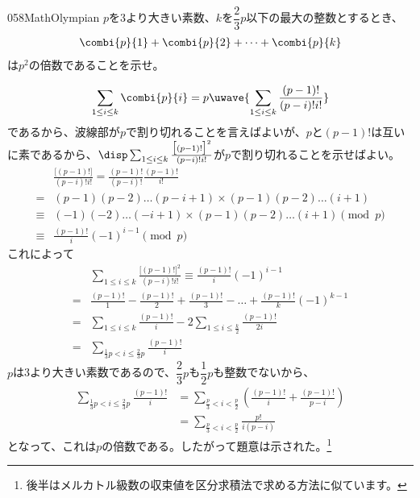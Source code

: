 \begin{thm}{058}{}{MathOlympian}
 $p$を3より大きい素数、$k$を$\dfrac{2}{3}p$以下の最大の整数とするとき、
 \begin{align*}
  \combi{p}{1}+\combi{p}{2}+\dots+\combi{p}{k}
 \end{align*}
 は$p^2$の倍数であることを示せ。
\end{thm}

\[ \sum_{1\le i\le k} \combi{p}{i}=p\uwave{\sum_{1\le i\le k}\frac{(p-1)!}{(p-i)! i!}} \]
であるから、波線部が$p$で割り切れることを言えばよいが、$p$と$(p-1)!$は互いに素であるから、$\disp \sum_{1\le i\le k}\frac{\bigl[(p-1)!\bigr]^2}{(p-i)! i!}$が$p$で割り切れることを示せばよい。
\begin{align*}
 &\frac{\bigl[(p-1)!\bigr]}{(p-i)! i!}=\frac{(p-1)!}{(p-i)!}\frac{(p-1)!}{i!} \\
 =& (p-1)(p-2)\dots(p-i+1)\times(p-1)(p-2)\dots(i+1) \\
 \equiv & (-1)(-2)\dots(-i+1)\times(p-1)(p-2)\dots(i+1) \pmod{p} \\
 \equiv & \frac{(p-1)!}{i}(-1)^{i-1} \pmod{p}
\end{align*}
これによって
\begin{align*}
 &\sum_{1\le i\le k} \frac{\bigl[(p-1)!\bigr]^2}{(p-i)! i!}\equiv \frac{(p-1)!}{i}(-1)^{i-1} \\
 =& \frac{(p-1)!}{1}-\frac{(p-1)!}{2}+\frac{(p-1)!}{3}-\dots+\frac{(p-1)!}{k}(-1)^{k-1} \\
 =& \sum_{1\le i\le k} \frac{(p-1)!}{i} - 2\sum_{1\le i\le \frac{k}{2}}\frac{(p-1)!}{2i} \\
 =& \sum_{\frac{1}{3}p< i\le \frac{2}{3}p} \frac{(p-1)!}{i}
\end{align*}
$p$は3より大きい素数であるので、$\dfrac{2}{3}p$も$\dfrac{1}{2}p$も整数でないから、
\begin{align*}
 \sum_{\frac{1}{3}p< i\le \frac{2}{3}p} \frac{(p-1)!}{i} &= \sum_{\frac{p}{3}<i<\frac{p}{2}}\left(\frac{(p-1)!}{i}+\frac{(p-1)!}{p-i}\right) \\
 &= \sum_{\frac{p}{3}<i<\frac{p}{2}} \frac{p!}{i(p-i)}
\end{align*}
となって、これは$p$の倍数である。したがって題意は示された。\footnote{後半はメルカトル級数の収束値を区分求積法で求める方法に似ています。}